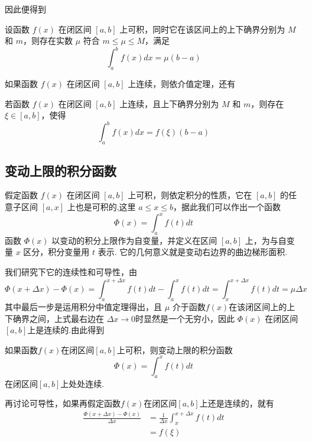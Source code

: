 因此便得到
\begin{theorem}
  \label{theorem:integra-midvalue}
  设函数 $f(x)$ 在闭区间 $[a,b]$ 上可积，同时它在该区间上的上下确界分别为 $M$ 和 $m$，则存在实数 $\mu$ 符合 $m \leqslant \mu \leqslant M$，满足
\[ \int_a^{b} f(x) dx = \mu(b-a) \]
\end{theorem}

如果函数 $f(x)$ 在闭区间 $[a,b]$ 上连续，则依介值定理，还有
\begin{theorem}
  \label{theorem:integral-midvalue-theoream-of-continuous-function}
  若函数 $f(x)$ 在闭区间 $[a,b]$ 上连续，且上下确界分别为 $M$ 和 $m$，则存在 $\xi \in [a,b]$，使得
\[ \int_a^{b} f(x) dx = f(\xi)(b-a) \]
\end{theorem}




\subsection{变动上限的积分函数}
\label{sec:variable-upper-limit-integral-function}

假定函数 $f(x)$ 在闭区间 $[a,b]$ 上可积，则依定积分的性质，它在 $[a,b]$ 的任意子区间 $[a,x]$ 上也是可积的,这里 $a \leqslant x \leqslant b$，据此我们可以作出一个函数
\[ \Phi(x) = \int_a^x f(t) dt \]
函数 $\Phi(x)$ 以变动的积分上限作为自变量，并定义在区间 $[a,b]$ 上，为与自变量 $x$ 区分，积分变量用 $t$ 表示. 它的几何意义就是变动右边界的曲边梯形面积.

我们研究下它的连续性和可导性，由
\[ \Phi(x+\Delta x) - \Phi(x) = \int_a^{x+\Delta x} f(t)dt - \int_a^x f(t)dt = \int_x^{x+\Delta x} f(t)dt = \mu \Delta x \]
其中最后一步是运用积分中值定理得出，且 $\mu$ 介于函数$f(x)$在该闭区间上的上下确界之间，上式最右边在 $\Delta x \rightarrow 0$时显然是一个无穷小，因此 $\Phi(x)$ 在闭区间 $[a,b]$上是连续的.由此得到
\begin{theorem}
  如果函数$f(x)$在闭区间$[a,b]$上可积，则变动上限的积分函数
  \[ \Phi(x) = \int_a^x f(t)dt \]
  在闭区间$[a,b]$上处处连续.
\end{theorem}

再讨论可导性，如果再假定函数$f(x)$在闭区间$[a,b]$上还是连续的，就有
\begin{equation*}
  \begin{split}
    \frac{\Phi(x+\Delta x)-\Phi(x)}{\Delta x} & = \frac{1}{\Delta x}\int_x^{x+\Delta x} f(t) dt \\
    & = f(\xi)
  \end{split}
\end{equation*}


